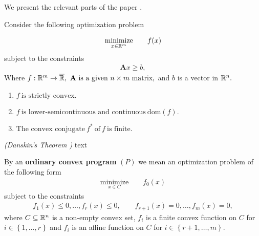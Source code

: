 We present the relevant parts of the paper \cite{Bertsekas2003}.

Consider the following optimization problem

  \begin{gather*}
    \underset{x\in \mathbb{R}^m}{\mathrm{minimize}}
    \qquad
    f(x)
  \end{gather*}
subject to the constraints
\begin{gather}
  \mathbf{A}x \ge b
  ,
\end{gather}
Where 
$
  f:
  \R^m
  \to 
  \overline{\R}
  ,
  \ 
  \mathbf{A} \ 
  \text{is a given}\ 
  n\times m
  \ 
  \text{matrix,}
$
 and $b$ is a vector in $\mathbb{R}^n.$
\begin{assumption}
  \begin{enumerate}[label={(\roman*)}]
    Assume that the map 
    $
      f: \R^m \to \overline{\R}
    $
    has the following properties.
    \item
      $
        f 
        \ 
        \text{is strictly convex.}
      $
    \item
      $
        f
        \ 
        \text{is lower-semicontinuous and continuous}
        \ 
        \mathrm{dom}(f)
        .
      $
    \item
      $
        \text{The convex conjugate}
        \ 
        f^*
        \ 
        \text{of}\ 
        f
        \ 
        \text{is finite}
        .
      $
  \end{enumerate}
\end{assumption}


\begin{proposition}
  \emph{(Danskin's Theorem \cite[page 649]{Bertsekas2003})}
  text
\end{proposition}


\begin{definition}
  \emph{\cite[§28]{Rockafellar1970}}
  By an \textbf{ordinary convex program}
  $(P)$
  we mean an optimization problem of the following form
  \begin{gather*}
    \underset{x\in C}{\mathrm{minimize}}
    \qquad
    f_0(x)
  \end{gather*}
subject to the constraints
\begin{gather}
  f_1(x)\le 0,
  \ldots,
  f_r(x)\le 0,
  \qquad
  f_{r+1}(x)= 0,
  \ldots,
  f_m(x)= 0,
\end{gather}
where $C\subseteq \mathbb{R}^n$
is a non-empty convex set,
$f_i$ is a finite convex function on $C$ for $i\in \left\{ 1,\ldots,r \right\}$
 and 
 $f_i$ is an affine function on $C$ for $i\in \left\{ r+1, \ldots, m \right\}.$
\end{definition}

